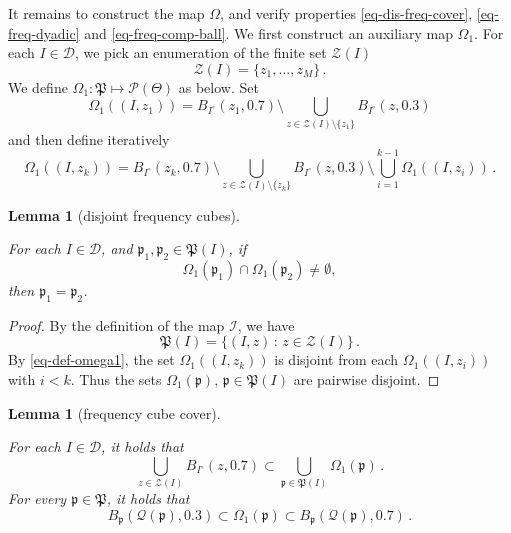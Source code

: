 \documentclass[10pt,a4paper]{article}
\theoremstyle{plain}
\newtheorem{lemma}[theorem]{Lemma}
\theoremstyle{definition}
\numberwithin{equation}{subsection}
\newcommand{\fp}{{\mathfrak p}}
\newcommand{\fP}{{\mathfrak P}}
\newcommand{\scI}{{\mathcal{I}}} %
\newcommand{\Mf}{{\Theta}}
\newcommand{\fcc}{{\mathcal{Q}}}
\newcommand{\lean}[1]{}
\newcommand{\leanok}{}
\begin{document}
It remains to construct the map $\Omega$, and verify properties \eqref{eq-dis-freq-cover}, \eqref{eq-freq-dyadic} and
\eqref{eq-freq-comp-ball}. We first construct an auxiliary map $\Omega_1$. For each $I \in \mathcal{D}$, we pick an enumeration of the finite set $\mathcal{Z}(I)$
$$
    \mathcal{Z}(I) = \{z_1, \dotsc, z_M\}\,.
$$
We define {$\Omega_1:\fP \mapsto \mathcal{P}(\Mf) $ as below}. Set
$$
    \Omega_1((I, z_1)) = B_{I^\circ}(z_1, 0.7) \setminus \bigcup_{z \in \mathcal{Z}(I)\setminus \{z_1\}} B_{I^\circ}(z, 0.3)
$$
and then define iteratively
\begin{equation}
    \label{eq-def-omega1}
    \Omega_1((I, z_k)) = B_{I^\circ}(z_k, 0.7) \setminus \bigcup_{z \in \mathcal{Z}(I) \setminus \{z_k\}} B_{I^\circ}(z, 0.3) \setminus \bigcup_{i=1}^{k-1} \Omega_1((I, z_i))\,.
\end{equation}
\begin{lemma}[disjoint frequency cubes]
    \label{disjoint-frequency-cubes}
    \leanok
    \lean{Construction.disjoint_frequency_cubes}
    For each $I \in \mathcal{D}$, and $\fp_1, \fp_2\in \fP(I)$,
    if $$\Omega_1(\fp_1)\cap \Omega_1(\fp_2)\neq \emptyset,$$ then $\fp_1=\fp_2$.
\end{lemma}

\begin{proof}
    \leanok
    By the definition of the map $\scI$, we have
    $$
        \fP(I) = \{(I, z) \, : \, z \in \mathcal{Z}(I)\}\,.
    $$
    By \eqref{eq-def-omega1}, the set $\Omega_1((I, z_k))$ is disjoint from each $\Omega_1((I, z_i))$ with $i < k$. Thus the sets $\Omega_1(\fp)$, $\fp \in \fP(I)$ are pairwise disjoint.
\end{proof}

\begin{lemma}[frequency cube cover]
    \label{frequency-cube-cover}
    \leanok
    \lean{Construction.iUnion_ball_subset_iUnion_Ω₁, Construction.ball_subset_Ω₁, Construction.Ω₁_subset_ball}
    For each $I \in \mathcal{D}$, it holds that
    \begin{equation}
    \label{eq-omega1-cover}
            \bigcup_{z \in \mathcal{Z}(I)} B_{I^\circ}(z, 0.7)\subset \bigcup_{\fp \in \fP(I)} \Omega_1(\fp)\,.
    \end{equation}
    For every $\fp \in \fP$, it holds that
    \begin{equation}
        \label{eq-omega1-incl}
        B_{\fp}(\fcc(\fp), 0.3) \subset \Omega_1(\fp) \subset B_{\fp}(\fcc(\fp), 0.7)\,.
    \end{equation}
\end{lemma}
\end{document}
